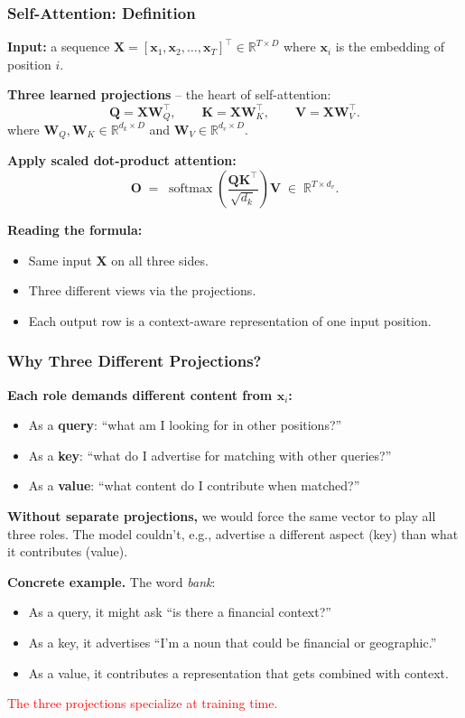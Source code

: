 \documentclass[notes,11pt, aspectratio=169]{beamer}
\DeclareMathOperator{\softmax}{softmax}
\newcommand{\vx}{\mathbf{x}}
\newcommand{\vK}{\mathbf{K}}
\newcommand{\vQ}{\mathbf{Q}}
\newcommand{\vV}{\mathbf{V}}
\newcommand{\vW}{\mathbf{W}}
\newcommand{\vX}{\mathbf{X}}
\newcommand{\vO}{\mathbf{O}}
\newcommand{\R}{\mathbb{R}}
\begin{document}
\begin{frame}
\frametitle{Self-Attention: Definition}

\textbf{Input:} a sequence $\vX = [\vx_1, \vx_2, \ldots, \vx_T]^\top \in \R^{T \times D}$ where $\vx_i$ is the embedding of position $i$.

\vspace{8pt}
\textbf{Three learned projections} -- the heart of self-attention:
\[
    \vQ = \vX \vW_Q^\top, \qquad \vK = \vX \vW_K^\top, \qquad \vV = \vX \vW_V^\top.
\]
where $\vW_Q, \vW_K \in \R^{d_k \times D}$ and $\vW_V \in \R^{d_v \times D}$.

\vspace{8pt}
\textbf{Apply scaled dot-product attention:}
\[
    \vO \;=\; \softmax\!\left(\frac{\vQ \vK^\top}{\sqrt{d_k}}\right) \vV
    \;\in\; \R^{T \times d_v}.
\]

\vspace{6pt}
\textbf{Reading the formula:}
\begin{itemize}
    \item Same input $\vX$ on all three sides.
    \item Three different views via the projections.
    \item Each output row is a context-aware representation of one input position.
\end{itemize}
\end{frame}

\begin{frame}
\frametitle{Why Three Different Projections?}

\textbf{Each role demands different content from $\vx_i$:}
\begin{itemize}
    \item As a \textbf{query}: ``what am I looking for in other positions?''
    \item As a \textbf{key}: ``what do I advertise for matching with other queries?''
    \item As a \textbf{value}: ``what content do I contribute when matched?''
\end{itemize}

\vspace{8pt}
\textbf{Without separate projections,} we would force the same vector to play all three roles. The model couldn't, e.g., advertise a different aspect (key) than what it contributes (value).

\vspace{8pt}
\textbf{Concrete example.} The word \textit{bank}:
\begin{itemize}
    \item As a query, it might ask ``is there a financial context?''
    \item As a key, it advertises ``I'm a noun that could be financial or geographic.''
    \item As a value, it contributes a representation that gets combined with context.
\end{itemize}

\textcolor{red}{The three projections specialize at training time.}
\end{frame}
\end{document}
